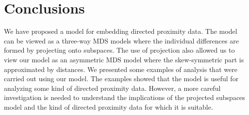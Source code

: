 \section{Conclusions}
\label{sec:conclusions}
We have proposed a model for embedding directed proximity data. The
model can be viewed as a three-way MDS models where the individual
differences are formed by projecting onto subspaces. The use of
projection also allowed us to view our model as an asymmetric MDS
model where the skew-symmetric part is approximated by distances. We
presented some examples of analysis that were carried out using our
model. The examples showed that the model is useful for analyzing some
kind of directed proximity data. However, a more careful investigation
is needed to understand the implications of the projected subspaces
model and the kind of directed proximity data for which it is
suitable. \\ \\

